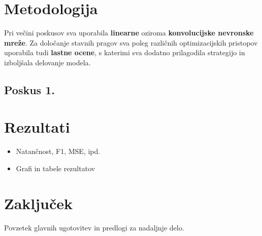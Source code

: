 \documentclass[a4paper,12pt]{article}
\begin{document}
\section{Metodologija}

Pri večini poskusov sva uporabila \textbf{linearne} oziroma 
\textbf{konvolucijske nevronske mreže}. 
Za določanje stavnih pragov sva poleg različnih optimizacijskih pristopov 
uporabila tudi \textbf{lastne ocene}, s katerimi sva dodatno prilagodila 
strategijo in izboljšala delovanje modela.

\subsection{Poskus 1.}

\section{Rezultati}
\begin{itemize}
    \item Natančnost, F1, MSE, ipd.
    \item Grafi in tabele rezultatov
\end{itemize}

\section{Zaključek}
Povzetek glavnih ugotovitev in predlogi za nadaljnje delo.
\end{document}

